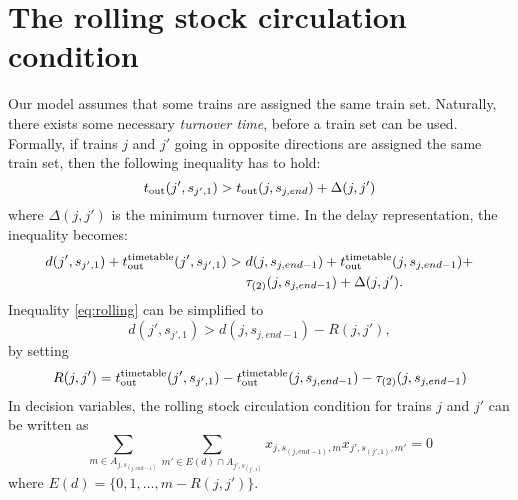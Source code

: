 \section{The rolling stock circulation condition}
Our model assumes that some trains are assigned the same train set. Naturally,
there exists some necessary \emph{turnover time}, before a train set can be
used. Formally, if trains $j$ and $j'$ going in opposite directions are
assigned the same train set, then the following inequality has to hold:
\begin{equation}
  t_\text{out}(j', s_{j',1}) > t_\text{out}(j, s_{j,end}) + \Delta(j, j')
\end{equation}
where $\Delta(j, j')$ is the minimum turnover time. In the delay
representation, the inequality becomes:
\begin{equation}
  \label{eq:rolling}
  \begin{split}
    d(j',s_{j',1}) + t_\text{out}^\text{timetable}(j',s_{j',1}) > & \; d(j, s_{j,end-1}) + t_\text{out}^\text{timetable}(j, s_{j,end-1}) + \\
    & \; \tau_{(2)}(j, s_{j,end-1}) + \Delta(j,j').
  \end{split}
\end{equation}
Inequality \eqref{eq:rolling} can be simplified to
\begin{equation}
  d(j',s_{j',1}) > d(j, s_{j,end-1}) - R(j,j'),
\end{equation}
by setting
\begin{equation}
  \label{eq:rolling2}
  R(j, j') = t_\text{out}^\text{timetable}(j',s_{j',1}) - t_\text{out}^\text{timetable}(j, s_{j,end-1}) - \tau_{(2)}(j,s_{j,end-1})
\end{equation}
In decision variables, the rolling stock circulation condition for trains $j$
and $j'$ can be written as
\begin{equation}
  \label{eq:qubo:rollingstock}
  \sum_{m \in A_{j, s_{(j, end-1)}}} \sum_{m' \in E(d) \cap A_{j',s_{(j',1)}}} x_{j,s_{(j,end-1)},m}x_{j', s_{(j',1)},m'} = 0
\end{equation}
where $E(d) = \{0, 1, \ldots, m-R(j, j')\}$.

